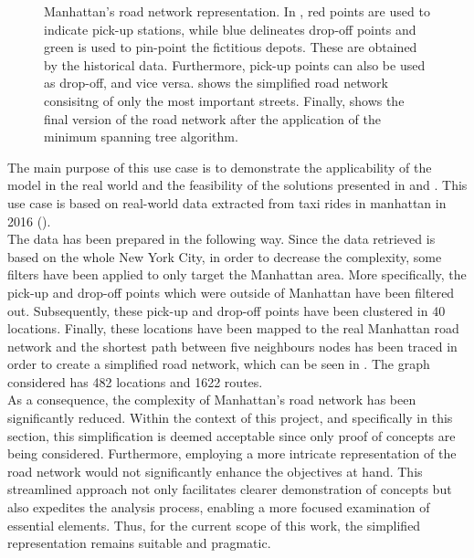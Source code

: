 \begin{figure}[tbh]
	\caption[Manhattan's road network representation]{Manhattan's road network representation. In , red points are used to indicate pick-up stations, while blue delineates drop-off points and green is used to pin-point the fictitious depots. These are obtained by the historical data. Furthermore, pick-up points can also be used as drop-off, and vice versa.  shows the simplified road network consisitng of only the most important streets. Finally,  shows the final version of the road network after the application of the minimum spanning tree algorithm.  }
	\label{fig:nyc_rn}
\end{figure}
The main purpose of this use case is to demonstrate the applicability of the model in the real world and the feasibility of the solutions presented in  and . This use case is based on real-world data extracted from taxi rides in manhattan in 2016 (\cite{Donovan2014}). \\
The data has been prepared in the following way. Since the data retrieved is based on the whole New York City, in order to decrease the complexity, some filters have been applied to only target the Manhattan area. More specifically, the pick-up and drop-off points which were outside of Manhattan have been filtered out. Subsequently, these pick-up and drop-off points have been clustered in 40 locations. Finally, these locations have been mapped to the real Manhattan road network and the shortest path between five neighbours nodes has been traced in order to create a simplified road network, which can be seen in . The graph considered has 482 locations and 1622 routes. \\
As a consequence, the complexity of Manhattan's road network has been significantly reduced. Within the context of this project, and specifically in this section, this simplification is deemed acceptable since only proof of concepts are being considered. Furthermore, employing a more intricate representation of the road network would not significantly enhance the objectives at hand. This streamlined approach not only facilitates clearer demonstration of concepts but also expedites the analysis process, enabling a more focused examination of essential elements. Thus, for the current scope of this work, the simplified representation remains suitable and pragmatic.
